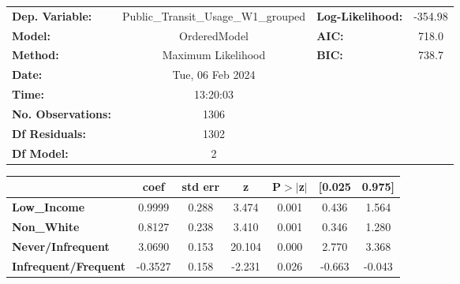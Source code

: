 \documentclass{report}
\begin{document}
\begin{center}
\begin{tabular}{lclc}
\toprule
\textbf{Dep. Variable:}      & Public\_Transit\_Usage\_W1\_grouped & \textbf{  Log-Likelihood:    } &   -354.98   \\
\textbf{Model:}              &             OrderedModel            & \textbf{  AIC:               } &     718.0   \\
\textbf{Method:}             &          Maximum Likelihood         & \textbf{  BIC:               } &     738.7   \\
\textbf{Date:}               &           Tue, 06 Feb 2024          & \textbf{                     } &             \\
\textbf{Time:}               &               13:20:03              & \textbf{                     } &             \\
\textbf{No. Observations:}   &                  1306               & \textbf{                     } &             \\
\textbf{Df Residuals:}       &                  1302               & \textbf{                     } &             \\
\textbf{Df Model:}           &                     2               & \textbf{                     } &             \\
\bottomrule
\end{tabular}
\begin{tabular}{lcccccc}
                             & \textbf{coef} & \textbf{std err} & \textbf{z} & \textbf{P$> |$z$|$} & \textbf{[0.025} & \textbf{0.975]}  \\
\midrule
\textbf{Low\_Income}         &       0.9999  &        0.288     &     3.474  &         0.001        &        0.436    &        1.564     \\
\textbf{Non\_White}          &       0.8127  &        0.238     &     3.410  &         0.001        &        0.346    &        1.280     \\
\textbf{Never/Infrequent}    &       3.0690  &        0.153     &    20.104  &         0.000        &        2.770    &        3.368     \\
\textbf{Infrequent/Frequent} &      -0.3527  &        0.158     &    -2.231  &         0.026        &       -0.663    &       -0.043     \\
\bottomrule
\end{tabular}
\end{center}
\end{document}
